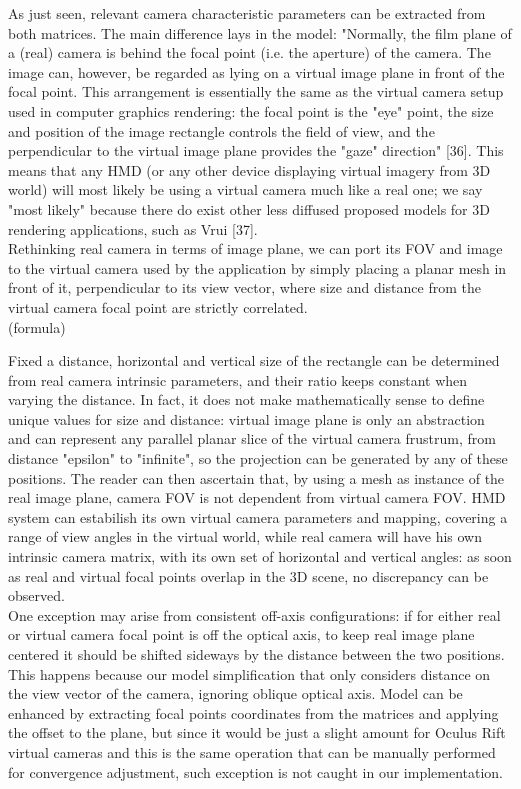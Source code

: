 As just seen, relevant camera characteristic parameters can be extracted from both matrices. The main difference lays in the model: "Normally, the film plane of a (real) camera is behind the focal point (i.e. the aperture) of the camera. The image can, however, be regarded as lying on a virtual image plane in front of the focal point. This arrangement is essentially the same as the virtual camera setup used in computer graphics rendering: the focal point is the "eye" point, the size and position of the image rectangle controls the field of view, and the perpendicular to the virtual image plane provides the "gaze" direction" [36]. This means that any HMD (or any other device displaying virtual imagery from 3D world) will most likely be using a virtual camera much like a real one; we say "most likely" because there do exist other less diffused proposed models for 3D rendering applications, such as Vrui [37].\\
Rethinking real camera in terms of image plane, we can port its FOV and image to the virtual camera used by the application by simply placing a planar mesh in front of it, perpendicular to its view vector, where size and distance from the virtual camera focal point are strictly correlated.\\

(formula)

Fixed a distance, horizontal and vertical size of the rectangle can be determined from real camera intrinsic parameters, and their ratio keeps constant when varying the distance. In fact, it does not make mathematically sense to define unique values for size and distance: virtual image plane is only an abstraction and can represent any parallel planar slice of the virtual camera frustrum, from distance "epsilon" to "infinite", so the projection can be generated by any of these positions. The reader can then ascertain that, by using a mesh as instance of the real image plane, camera FOV is not dependent from virtual camera FOV. HMD system can estabilish its own virtual camera parameters and mapping, covering a range of view angles in the virtual world, while real camera will have his own intrinsic camera matrix, with its own set of horizontal and vertical angles: as soon as real and virtual focal points overlap in the 3D scene, no discrepancy can be observed.\\
One exception may arise from consistent off-axis configurations: if for either real or virtual camera focal point is off the optical axis, to keep real image plane centered it should be shifted sideways by the distance between the two positions. This happens because our model simplification that only considers distance on the view vector of the camera, ignoring oblique optical axis. Model can be enhanced by extracting focal points coordinates from the matrices and applying the offset to the plane, but since it would be just a slight amount for Oculus Rift virtual cameras and this is the same operation that can be manually performed for convergence adjustment, such exception is not caught in our implementation.

